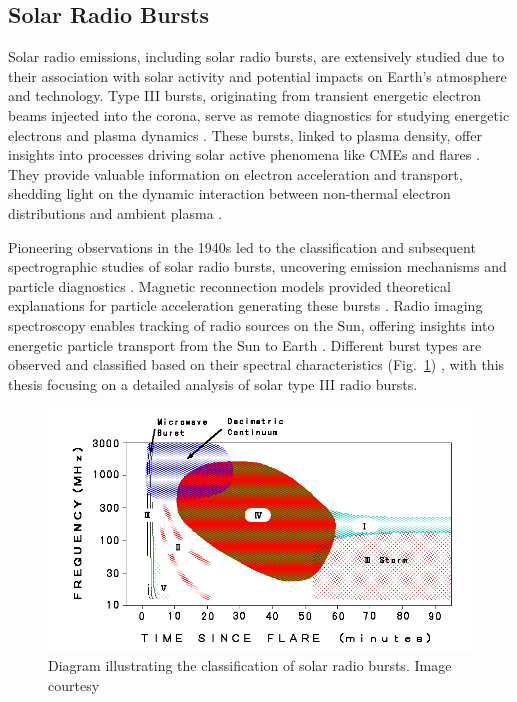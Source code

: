 \subsection{Solar Radio Bursts}
Solar radio emissions, including solar radio bursts, are extensively studied due to their association with solar activity and potential impacts on Earth's atmosphere and technology. Type III bursts, originating from transient energetic electron beams injected into the corona, serve as remote diagnostics for studying energetic electrons and plasma dynamics \citep{ergun_1998, pick_2006, reid_2020}. These bursts, linked to plasma density, offer insights into processes driving solar active phenomena like CMEs and flares \citep{reid_2014, kontar_2017}. They provide valuable information on electron acceleration and transport, shedding light on the dynamic interaction between non-thermal electron distributions and ambient plasma \citep{melrose_1980}.

Pioneering observations in the 1940s led to the classification and subsequent spectrographic studies of solar radio bursts, uncovering emission mechanisms and particle diagnostics \citep{wild_1963, suzuki_1985}. Magnetic reconnection models provided theoretical explanations for particle acceleration generating these bursts \citep{holman_2011}. Radio imaging spectroscopy enables tracking of radio sources on the Sun, offering insights into energetic particle transport from the Sun to Earth \citep{krucker_2011, klassen_2003a, klassen_2003b}. Different burst types are observed and classified based on their spectral characteristics (Fig.~\ref{fig_srb_types}) \citep{wild_1963}, with this thesis focusing on a detailed analysis of solar type III radio bursts.

\begin{figure}[!htp]
	\centering
	\includegraphics[width=0.8\columnwidth]{chapter1/figs/typefignew.png}
	\caption[Classification of solar radio bursts]{Diagram illustrating the classification of solar radio bursts. Image courtesy\protect\footnotemark}
	\label{fig_srb_types}
\end{figure}

